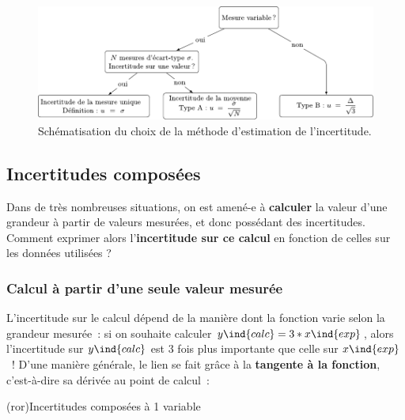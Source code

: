 \documentclass[../../main/main.tex]{subfiles}
\begin{document}
\begin{figure}[htbp!]
  \centering
  \includegraphics[width=\linewidth]{choix_incert}
  \caption{Schématisation du choix de la méthode d'estimation de l'incertitude.}
  \label{fig:choix_incert}
\end{figure}

\subsection{Incertitudes composées}
Dans de très nombreuses situations, on est amené-e à \textbf{calculer} la valeur
d'une grandeur à partir de valeurs mesurées, et donc possédant des incertitudes.
Comment exprimer alors l'\textbf{incertitude sur ce calcul} en fonction de
celles sur les données utilisées ?

\subsubsection{Calcul à partir d'une seule valeur mesurée}
L'incertitude sur le calcul dépend de la manière dont la fonction varie selon
la grandeur mesurée~: si on souhaite calculer $y\ind{calc} = 3*x\ind{exp}$, alors l'incertitude sur
$y\ind{calc}$ est 3 fois plus importante que celle sur $x\ind{exp}$~! D'une
manière générale, le lien se fait grâce à la \textbf{tangente à la fonction},
c'est-à-dire sa dérivée au point de calcul~:
\begin{tcb*}(ror){Incertitudes composées à 1 variable}
	\psw{%
		\[
			\boxed{y\ind{calc} = f(x\ind{mes}) \Ra u(y\ind{calc}) =
				\abs{\dv{f}{x}(x\ind{mes})}u(x\ind{mes})}
		\]
	}%
\end{tcb*}
\end{document}
